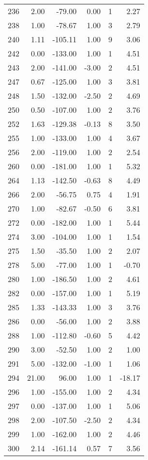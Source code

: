 \begin{appendices}
\begin{longtable}[c]{@{}rrrrrr@{}}
236 & 2.00 & -79.00 & 0.00 & 1 & 2.27 \\
238 & 1.00 & -78.67 & 1.00 & 3 & 2.79 \\
240 & 1.11 & -105.11 & 1.00 & 9 & 3.06 \\
242 & 0.00 & -133.00 & 1.00 & 1 & 4.51 \\
243 & 2.00 & -141.00 & -3.00 & 2 & 4.51 \\
247 & 0.67 & -125.00 & 1.00 & 3 & 3.81 \\
248 & 1.50 & -132.00 & -2.50 & 2 & 4.69 \\
250 & 0.50 & -107.00 & 1.00 & 2 & 3.76 \\
252 & 1.63 & -129.38 & -0.13 & 8 & 3.50 \\
255 & 1.00 & -133.00 & 1.00 & 4 & 3.67 \\
256 & 2.00 & -119.00 & 1.00 & 2 & 2.54 \\
260 & 0.00 & -181.00 & 1.00 & 1 & 5.32 \\
264 & 1.13 & -142.50 & -0.63 & 8 & 4.49 \\
266 & 2.00 & -56.75 & 0.75 & 4 & 1.91 \\
270 & 1.00 & -82.67 & -0.50 & 6 & 3.81 \\
272 & 0.00 & -182.00 & 1.00 & 1 & 5.44 \\
274 & 3.00 & -104.00 & 1.00 & 1 & 1.54 \\
275 & 1.50 & -35.50 & 1.00 & 2 & 2.07 \\
278 & 5.00 & -77.00 & 1.00 & 1 & -0.70 \\
280 & 1.00 & -186.50 & 1.00 & 2 & 4.61 \\
282 & 0.00 & -157.00 & 1.00 & 1 & 5.19 \\
285 & 1.33 & -143.33 & 1.00 & 3 & 3.76 \\
286 & 0.00 & -56.00 & 1.00 & 2 & 3.88 \\
288 & 1.00 & -112.80 & -0.60 & 5 & 4.42 \\
290 & 3.00 & -52.50 & 1.00 & 2 & 1.00 \\
291 & 5.00 & -132.00 & -1.00 & 1 & 1.06 \\
294 & 21.00 & 96.00 & 1.00 & 1 & -18.17 \\
296 & 1.00 & -155.00 & 1.00 & 2 & 4.34 \\
297 & 0.00 & -137.00 & 1.00 & 1 & 5.06 \\
298 & 2.00 & -107.50 & -2.50 & 2 & 4.34 \\
299 & 1.00 & -162.00 & 1.00 & 2 & 4.46 \\
300 & 2.14 & -161.14 & 0.57 & 7 & 3.56 \\

\end{longtable}
\end{appendices}

